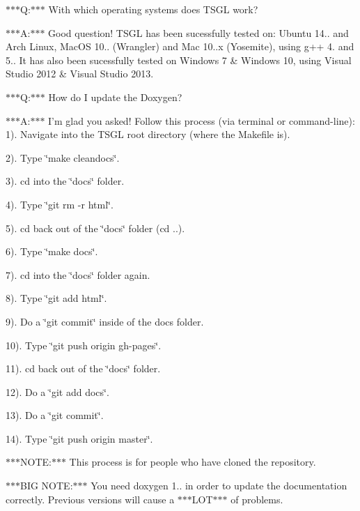 $\ast$$\ast$$\ast$\-Q\-:$\ast$$\ast$$\ast$ With which operating systems does T\-S\-G\-L work?

$\ast$$\ast$$\ast$\-A\-:$\ast$$\ast$$\ast$ Good question! T\-S\-G\-L has been sucessfully tested on\-: Ubuntu 14.. and Arch Linux, Mac\-O\-S 10.. (Wrangler) and Mac 10..\-x (Yosemite), using g++ 4. and 5.. It has also been sucessfully tested on Windows 7 \& Windows 10, using Visual Studio 2012 \& Visual Studio 2013.

$\ast$$\ast$$\ast$\-Q\-:$\ast$$\ast$$\ast$ How do I update the Doxygen?

$\ast$$\ast$$\ast$\-A\-:$\ast$$\ast$$\ast$ I'm glad you asked! Follow this process (via terminal or command-\/line)\-: 1). Navigate into the T\-S\-G\-L root directory (where the Makefile is).

2). Type \char`\"{}make cleandocs\char`\"{}.

3). cd into the \char`\"{}docs\char`\"{} folder.

4). Type \char`\"{}git rm -\/r html\char`\"{}.

5). cd back out of the \char`\"{}docs\char`\"{} folder (cd ..).

6). Type \char`\"{}make docs\char`\"{}.

7). cd into the \char`\"{}docs\char`\"{} folder again.

8). Type \char`\"{}git add html\char`\"{}.

9). Do a \char`\"{}git commit\char`\"{} inside of the docs folder.

10). Type \char`\"{}git push origin gh-\/pages\char`\"{}.

11). cd back out of the \char`\"{}docs\char`\"{} folder.

12). Do a \char`\"{}git add docs\char`\"{}.

13). Do a \char`\"{}git commit\char`\"{}.

14). Type \char`\"{}git push origin master\char`\"{}.

$\ast$$\ast$$\ast$\-N\-O\-T\-E\-:$\ast$$\ast$$\ast$ This process is for people who have cloned the repository.

$\ast$$\ast$$\ast$\-B\-I\-G N\-O\-T\-E\-:$\ast$$\ast$$\ast$ You need doxygen 1.. in order to update the documentation correctly. Previous versions will cause a $\ast$$\ast$$\ast$\-L\-O\-T$\ast$$\ast$$\ast$ of problems. 